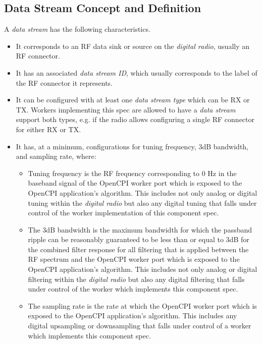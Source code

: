 \documentclass{article}
\begin{document}
  \subsection{Data Stream Concept and Definition}
    A \textit{data stream} has the following characteristics.
    \begin{itemize}
      \item It corresponds to an RF data sink or source on the
            \textit{digital radio},
            usually an RF connector.
      \item It has an associated \textit{data stream ID}, which usually
            corresponds to the
            label of the RF connector it represents.
      \item It can be configured with at least one \textit{data stream type}
            which can be RX or TX. Workers implementing this spec are allowed to
            have a
            \textit{data stream} support both types, e.g. if the radio allows
            configuring a single RF connector for either RX or TX.
      \item It has, at a minimum, configurations for tuning frequency, 3dB bandwidth,
            and sampling rate, where:
      \begin{itemize}
        \item Tuning frequency is the RF frequency corresponding to 0 Hz in the
              baseband signal of the OpenCPI worker port which is exposed to
              the OpenCPI application's algorithm. This includes not only
              analog or digital tuning within the \textit{digital radio} but
              also any digital tuning that falls under control of the worker
              implementation of this component spec.
        \item The 3dB bandwidth is the maximum bandwidth for which the passband
              ripple can be reasonably guaranteed to be less than or equal to
              3dB for the combined filter response for all filtering that is
              applied between the RF spectrum and the OpenCPI worker port
              which is exposed to the OpenCPI application's algorithm. This
              includes not only analog or digital filtering within the
              \textit{digital radio} but also any digital filtering that falls
              under control of the worker which implements this component spec.
        \item The sampling rate is the rate at which the OpenCPI worker port
              which
              is exposed to the OpenCPI application's algorithm. This includes
              any digital upsampling or downsampling that falls under control of
              a worker which implements this component spec.
      \end{itemize}
    \end{itemize}
\end{document}
